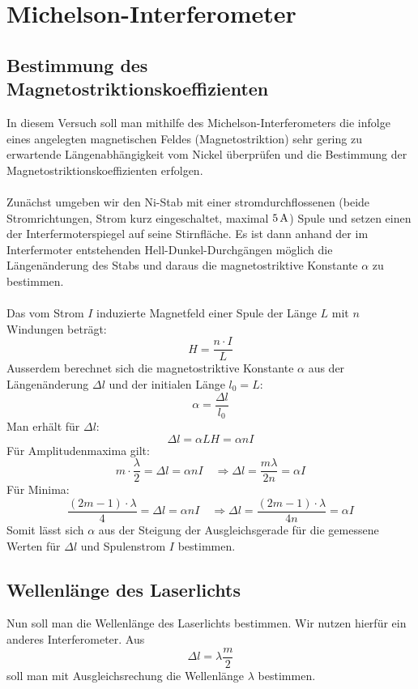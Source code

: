 \documentclass[a4paper,titlepage]{scrartcl}
\numberwithin{equation}{section}
\begin{document}
\section{Michelson-Interferometer}
\subsection{Bestimmung des Magnetostriktionskoeffizienten}
In diesem Versuch soll man mithilfe des Michelson-Interferometers die infolge eines angelegten magnetischen Feldes (Magnetostriktion) sehr gering zu erwartende Längenabhängigkeit vom Nickel überprüfen und die Bestimmung der Magnetostriktionskoeffizienten erfolgen.\\ \\
Zunächst umgeben wir den Ni-Stab mit einer stromdurchflossenen (beide Stromrichtungen, Strom kurz eingeschaltet, maximal $\unit[5]{A}$) Spule und setzen einen der Interfermoterspiegel auf seine Stirnfläche. Es ist dann anhand der im Interfermoter entstehenden Hell-Dunkel-Durchgängen möglich die Längenänderung des Stabs und daraus die magnetostriktive Konstante $\alpha$ zu bestimmen.\\ \\
Das vom Strom $I$ induzierte Magnetfeld einer Spule der Länge $L$ mit $n$ Windungen beträgt:
\begin{equation*}
H=\frac{n \cdot I}{L}
\end{equation*}
Ausserdem berechnet sich die magnetostriktive Konstante $\alpha$ aus der Längenänderung $\Delta l$ und der initialen Länge $l_0=L$:
\begin{equation*}
\alpha=\frac{\Delta l}{l_0}
\end{equation*}
Man erhält für $\Delta l$:
\begin{equation*}
\Delta l = \alpha L H = \alpha n I
\end{equation*}
Für Amplitudenmaxima gilt:
\begin{equation*}
m \cdot \frac{\lambda}{2}= \Delta l = \alpha n I \quad \Rightarrow \Delta l = \frac{m \lambda}{2n}=\alpha I
\end{equation*}
Für Minima:
\begin{equation*}
\frac{(2m-1) \cdot \lambda}{4}=\Delta l = \alpha n I \quad \Rightarrow \Delta l = \frac{(2m-1)\cdot \lambda}{4n}=\alpha I
\end{equation*}
Somit lässt sich $\alpha$ aus der Steigung der Ausgleichsgerade für die gemessene Werten für $\Delta l$ und Spulenstrom $I$ bestimmen.
\subsection{Wellenlänge des Laserlichts}
Nun soll man die Wellenlänge des Laserlichts bestimmen. Wir nutzen hierfür ein anderes Interferometer. Aus
\begin{equation*}
\Delta l = \lambda \frac{m}{2}
\end{equation*}
soll man mit Ausgleichsrechung die Wellenlänge $\lambda$ bestimmen.
\end{document}
